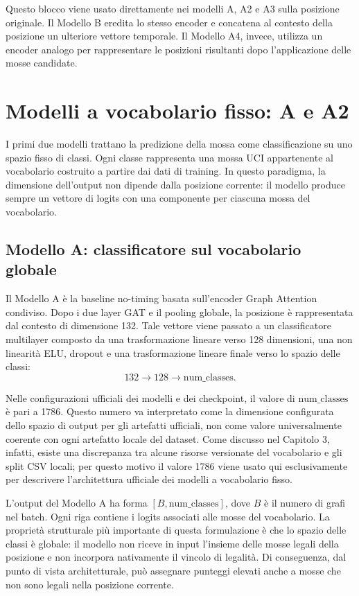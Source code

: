 Questo blocco viene usato direttamente nei modelli A, A2 e A3 sulla posizione originale. Il Modello B eredita lo stesso encoder e concatena al contesto della posizione un ulteriore vettore temporale. Il Modello A4, invece, utilizza un encoder analogo per rappresentare le posizioni risultanti dopo l'applicazione delle mosse candidate.

\section{Modelli a vocabolario fisso: A e A2}

I primi due modelli trattano la predizione della mossa come classificazione su uno spazio fisso di classi. Ogni classe rappresenta una mossa UCI appartenente al vocabolario costruito a partire dai dati di training. In questo paradigma, la dimensione dell'output non dipende dalla posizione corrente: il modello produce sempre un vettore di logits con una componente per ciascuna mossa del vocabolario.

\subsection{Modello A: classificatore sul vocabolario globale}

Il Modello A \`e la baseline no-timing basata sull'encoder Graph Attention condiviso. Dopo i due layer GAT e il pooling globale, la posizione \`e rappresentata dal contesto di dimensione 132. Tale vettore viene passato a un classificatore multilayer composto da una trasformazione lineare verso 128 dimensioni, una non linearit\`a ELU, dropout e una trasformazione lineare finale verso lo spazio delle classi:
\[
    132 \rightarrow 128 \rightarrow \mathrm{num\_classes}.
\]

Nelle configurazioni ufficiali dei modelli e dei checkpoint, il valore di \(\mathrm{num\_classes}\) \`e pari a 1786. Questo numero va interpretato come la dimensione configurata dello spazio di output per gli artefatti ufficiali, non come valore universalmente coerente con ogni artefatto locale del dataset. Come discusso nel Capitolo 3, infatti, esiste una discrepanza tra alcune risorse versionate del vocabolario e gli split CSV locali; per questo motivo il valore 1786 viene usato qui esclusivamente per descrivere l'architettura ufficiale dei modelli a vocabolario fisso.

L'output del Modello A ha forma \([B, \mathrm{num\_classes}]\), dove \(B\) \`e il numero di grafi nel batch. Ogni riga contiene i logits associati alle mosse del vocabolario. La propriet\`a strutturale pi\`u importante di questa formulazione \`e che lo spazio delle classi \`e globale: il modello non riceve in input l'insieme delle mosse legali della posizione e non incorpora nativamente il vincolo di legalit\`a. Di conseguenza, dal punto di vista architetturale, pu\`o assegnare punteggi elevati anche a mosse che non sono legali nella posizione corrente.


